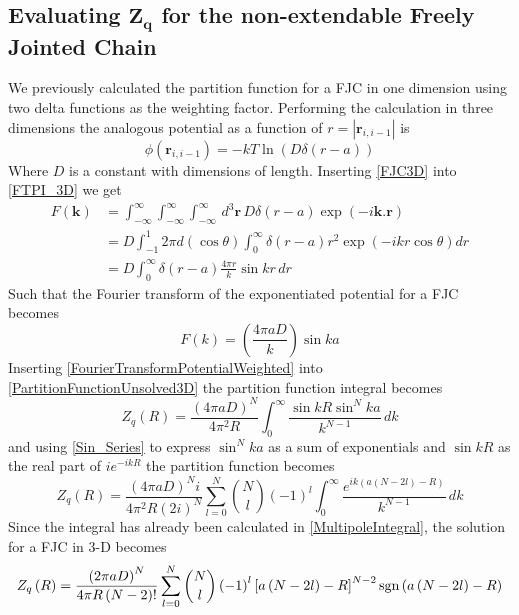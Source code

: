 \subsection{Evaluating $\boldsymbol{Z_{q}}$ for the non-extendable Freely Jointed Chain}

We previously calculated the partition function for a FJC in one dimension using two delta functions as the weighting factor. Performing the calculation in three dimensions
the analogous potential as a function of $r = |\boldsymbol{r}_{i,i-1}|$ is
%
\begin{equation}
\phi\left(\boldsymbol{r}_{i,i-1}\right)=-kT\ln\left(D\delta\left(r-a\right)\right)\label{FJC3D}
\end{equation}
%
Where $D$ is a constant with dimensions of length. Inserting \eqref{FJC3D} into \eqref{FTPI_3D} we get
%
\begin{align}
F\left(\boldsymbol{k}\right) & =\int_{-\infty}^{\infty}\int_{-\infty}^{\infty}\int_{-\infty}^{\infty}\, d^{3}\boldsymbol{r}\,D\delta\left(r-a\right)\exp\left(-i\boldsymbol{k.r}\right)\nonumber\\
 & =D\int_{-1}^{1}2\pi d\left(\cos\theta\right)\int_{0}^{\infty}\delta\left(r-a\right)r^{2}\exp\left(-ikr\cos\theta\right)dr\nonumber\\
 & =D\int_{0}^{\infty}\delta\left(r-a\right)\frac{4\pi r}{k}\sin kr\,dr\label{FJC_FTP_Unsolved}
\end{align}
%
Such that the Fourier transform of the exponentiated potential for a FJC becomes
%
\begin{equation}
F\left(k\right)=\left(\frac{4\pi a D}{k}\right)\sin ka\label{FourierTransformPotentialWeighted}
\end{equation}
%
Inserting \eqref{FourierTransformPotentialWeighted} into \eqref{PartitionFunctionUnsolved3D}
the partition function integral becomes
%
\begin{equation}
Z_{q}\left(R\right) = \frac{\left(4 \pi a D\right)^{N}}{4\pi^{2}R} \int_{0}^{\infty}\frac{\sin kR \sin^{N}ka}{k^{N-1}}\,dk
\end{equation}
%
and using \eqref{Sin_Series} to express $\sin^{N}ka$ as a sum of exponentials and $\sin kR$ as the real part of $ie^{-ikR}$ the partition function becomes
%
\begin{equation}
Z_{q}\left(R\right) = \frac{\left(4 \pi a D\right)^{N}i}{4\pi^{2}R \left(2i\right)^{N}}\sum^{N}_{l=0}\binom{N}{l}\left(-1\right)^{l}\int^{\infty}_{0}\frac{e^{ik\left(a\left(N-2l\right)-R\right)}}{k^{N-1}}\,dk
\end{equation}
%
Since the integral has already been calculated in \eqref{MultipoleIntegral}, the solution for a FJC in 3-D becomes
%
\begin{equation}
Z_{q}\left(R\right)=\frac{\left(2\pi a D\right)^{N}}{4\pi R\left(N-2\right)!}\sum_{l=0}^{N}\binom{N}{l}\left(-1\right)^{l}\left[a\left(N-2l\right)-R\right]^{N-2}\text{sgn}\left(a\left(N-2l\right)-R\right)\label{PartitionFunction3DFJC}
\end{equation}

